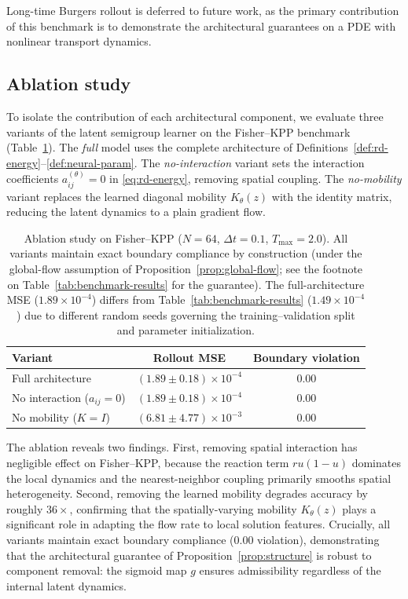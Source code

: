 \documentclass[11pt]{article}
\begin{document}
Long-time Burgers rollout is deferred to future work, as the primary contribution of this benchmark is to demonstrate the architectural guarantees on a PDE with nonlinear transport dynamics.

\subsection{Ablation study}\label{subsec:ablation}
To isolate the contribution of each architectural component, we evaluate three variants of the latent semigroup learner on the Fisher--KPP benchmark (Table~\ref{tab:ablation}). The \emph{full} model uses the complete architecture of Definitions~\ref{def:rd-energy}--\ref{def:neural-param}. The \emph{no-interaction} variant sets the interaction coefficients $a_{ij}^{(\theta)}=0$ in \eqref{eq:rd-energy}, removing spatial coupling. The \emph{no-mobility} variant replaces the learned diagonal mobility $K_{\theta}(z)$ with the identity matrix, reducing the latent dynamics to a plain gradient flow.

\begin{table}[htbp]
\centering
\caption{Ablation study on Fisher--KPP ($N=64$, $\Delta t=0.1$, $T_{\max}=2.0$). All variants maintain exact boundary compliance by construction (under the global-flow assumption of Proposition~\ref{prop:global-flow}; see the footnote on Table~\ref{tab:benchmark-results} for the guarantee). The full-architecture MSE ($1.89\times10^{-4}$) differs from Table~\ref{tab:benchmark-results} ($1.49\times10^{-4}$) due to different random seeds governing the training--validation split and parameter initialization.}
\label{tab:ablation}
\small
\begin{tabular}{@{}lcc@{}}
\hline
Variant & Rollout MSE & Boundary violation \\
\hline
Full architecture & $(1.89\pm 0.18)\times10^{-4}$ & $0.00$ \\
No interaction ($a_{ij}=0$) & $(1.89\pm 0.18)\times10^{-4}$ & $0.00$ \\
No mobility ($K=I$) & $(6.81\pm 4.77)\times10^{-3}$ & $0.00$ \\
\hline
\end{tabular}
\end{table}

The ablation reveals two findings. First, removing spatial interaction has negligible effect on Fisher--KPP, because the reaction term $ru(1-u)$ dominates the local dynamics and the nearest-neighbor coupling primarily smooths spatial heterogeneity. Second, removing the learned mobility degrades accuracy by roughly $36\times$, confirming that the spatially-varying mobility $K_{\theta}(z)$ plays a significant role in adapting the flow rate to local solution features. Crucially, all variants maintain exact boundary compliance ($0.00$ violation), demonstrating that the architectural guarantee of Proposition~\ref{prop:structure} is robust to component removal: the sigmoid map $g$ ensures admissibility regardless of the internal latent dynamics.
\end{document}
